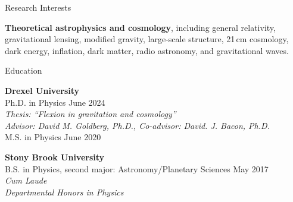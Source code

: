 \documentclass{resume} %
\date{Last Updated: 13 June 2025} %
\begin{document}


\begin{rSection}{Research Interests}

\textbf{Theoretical astrophysics and cosmology}, including general relativity, gravitational lensing, modified gravity, large-scale structure, 21\,cm cosmology, dark energy, inflation, dark matter, radio astronomy, and gravitational waves. 

\end{rSection}


\begin{rSection}{Education}

\textbf{Drexel University} \\%
{\color{MidnightBlue} Ph.D.} in Physics \hfill {June 2024} \\
\textit{Thesis: ``Flexion in gravitation and cosmology''}\\
\textit{Advisor: David M. Goldberg, Ph.D., Co-advisor: David. J. Bacon, Ph.D.}\\
{\color{MidnightBlue} M.S.} in Physics \hfill{June 2020}%

\textbf{Stony Brook University} \\%
{\color{MidnightBlue} B.S.} in Physics, second major: Astronomy/Planetary Sciences \hfill{May 2017}\\%
\textit{Cum Laude}\\
\textit{Departmental Honors in Physics}

\end{rSection}

\end{document}
